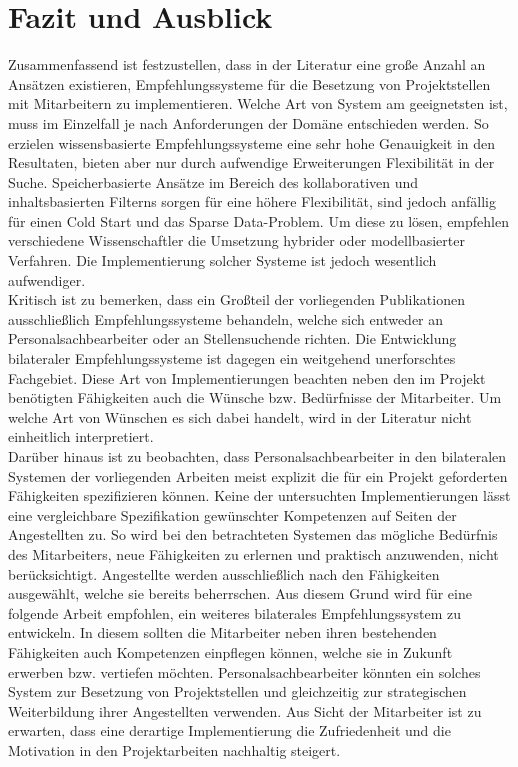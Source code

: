 \chapter{Fazit und Ausblick}
\label{ch:fazit}
Zusammenfassend ist festzustellen, dass in der Literatur eine große Anzahl an Ansätzen existieren, Empfehlungssysteme für die Besetzung von Projektstellen mit Mitarbeitern zu implementieren. Welche Art von System am geeignetsten ist, muss im Einzelfall je nach Anforderungen der Domäne entschieden werden. So erzielen wissensbasierte Empfehlungssysteme eine sehr hohe Genauigkeit in den Resultaten, bieten aber nur durch aufwendige Erweiterungen Flexibilität in der Suche. Speicherbasierte Ansätze im Bereich des kollaborativen und inhaltsbasierten Filterns sorgen für eine höhere Flexibilität, sind jedoch anfällig für einen Cold Start und das Sparse Data-Problem. Um diese zu lösen, empfehlen verschiedene Wissenschaftler die Umsetzung hybrider oder modellbasierter Verfahren. Die Implementierung solcher Systeme ist jedoch wesentlich aufwendiger.\\
Kritisch ist zu bemerken, dass ein Großteil der vorliegenden Publikationen ausschließlich Empfehlungssysteme behandeln, welche sich entweder an Personalsachbearbeiter oder an Stellensuchende richten. Die Entwicklung bilateraler Empfehlungssysteme ist dagegen ein weitgehend unerforschtes Fachgebiet. Diese Art von Implementierungen beachten neben den im Projekt benötigten Fähigkeiten auch die Wünsche bzw. Bedürfnisse der Mitarbeiter. Um welche Art von Wünschen es sich dabei handelt, wird in der Literatur nicht einheitlich interpretiert.\\
Darüber hinaus ist zu beobachten, dass Personalsachbearbeiter in den bilateralen Systemen der vorliegenden Arbeiten meist explizit die für ein Projekt geforderten Fähigkeiten spezifizieren können. Keine der untersuchten Implementierungen lässt eine vergleichbare Spezifikation gewünschter Kompetenzen auf Seiten der Angestellten zu. So wird bei den betrachteten Systemen das mögliche Bedürfnis des Mitarbeiters, neue Fähigkeiten zu erlernen und praktisch anzuwenden, nicht berücksichtigt. Angestellte werden ausschließlich nach den Fähigkeiten ausgewählt, welche sie bereits beherrschen. Aus diesem Grund wird für eine folgende Arbeit empfohlen, ein weiteres bilaterales Empfehlungssystem zu entwickeln. In diesem sollten die Mitarbeiter neben ihren bestehenden Fähigkeiten auch Kompetenzen einpflegen können, welche sie in Zukunft erwerben bzw. vertiefen möchten. Personalsachbearbeiter könnten ein solches System zur Besetzung von Projektstellen und gleichzeitig zur strategischen Weiterbildung ihrer Angestellten verwenden. Aus Sicht der Mitarbeiter ist zu erwarten, dass eine derartige Implementierung die Zufriedenheit und die Motivation in den Projektarbeiten nachhaltig steigert. 
